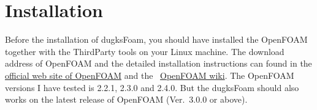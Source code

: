 
\chapter{Installation}

\label{inst}
Before the installation of dugksFoam, you should have installed the OpenFOAM together with the ThirdParty tools on your Linux machine.
The download address of OpenFOAM and the detailed installation instructions can found in the
\href{http://openfoam.org/download/}{official web site of OpenFOAM} and the ~\href{https://openfoamwiki.net/index.php/Main_Page}{OpenFOAM wiki}.
The OpenFOAM versions I have tested is 2.2.1, 2.3.0 and 2.4.0.
But the dugksFoam should also works on the latest release of OpenFOAM (Ver.~3.0.0 or above).

